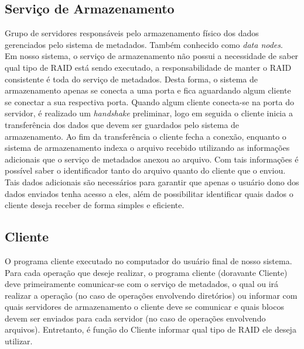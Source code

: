 \subsection{Serviço de Armazenamento}
Grupo de servidores responsáveis pelo armazenamento físico dos dados gerenciados pelo sistema de metadados. Também conhecido como \textit{data nodes}.\\

Em nosso sistema, o serviço de armazenamento não possui a necessidade de saber qual tipo de RAID está sendo executado, a responsabilidade de manter o RAID consistente é toda do serviço de metadados. Desta forma, o sistema de armazenamento apenas se conecta a uma porta e fica aguardando algum cliente se conectar a sua respectiva porta. Quando algum cliente conecta-se na porta do servidor, é realizado um \textit{handshake} preliminar, logo em seguida o cliente inicia a transferência dos dados que devem ser guardados pelo sistema de armazenamento. Ao fim da transferência o cliente fecha a conexão, enquanto o sistema de armazenamento indexa o arquivo recebido utilizando as informações adicionais que o serviço de metadados anexou ao arquivo. Com tais informações é possível saber o identificador tanto do arquivo quanto do cliente que o enviou. Tais dados adicionais são necessários para garantir que apenas o usuário dono dos dados enviados tenha acesso a eles, além de possibilitar identificar quais dados o cliente deseja receber de forma simples e eficiente.  
\\

\subsection{Cliente}
O programa cliente executado no computador do usuário final de nosso sistema. 
\\

Para cada operação que deseje realizar, o programa cliente (doravante Cliente) deve primeiramente comunicar-se com o serviço de metadados, o qual ou irá realizar a operação (no caso de operações envolvendo diretórios) ou informar com quais servidores de armazenamento o cliente deve se comunicar e quais blocos devem ser enviados para cada servidor (no caso de operações envolvendo arquivos). Entretanto, é função do Cliente informar qual tipo de RAID ele deseja utilizar.
\\

